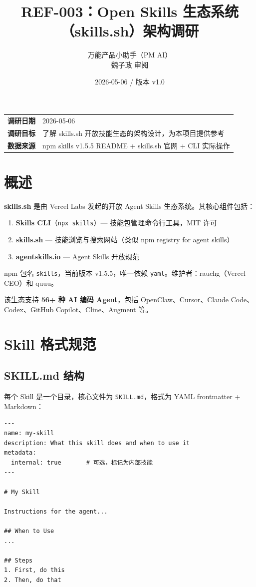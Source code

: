 \documentclass[11pt,a4paper]{article}
\title{\textbf{REF-003：Open Skills 生态系统（skills.sh）架构调研}}
\author{万能产品小助手（PM AI）\\魏子政 审阅}
\date{2026-05-06 / 版本 v1.0}
\begin{document}
\maketitle

\begin{center}
\begin{tabular}{>{\bfseries}p{3cm} p{10cm}}
\toprule
调研日期 & 2026-05-06 \\
调研目标 & 了解 skills.sh 开放技能生态的架构设计，为本项目提供参考 \\
数据来源 & npm skills v1.5.5 README + skills.sh 官网 + CLI 实际操作 \\
\bottomrule
\end{tabular}
\end{center}

\section{概述}

\textbf{skills.sh} 是由 Vercel Labs 发起的开放 Agent Skills 生态系统。其核心组件包括：

\begin{enumerate}[nosep]
  \item \textbf{Skills CLI}（\texttt{npx skills}）--- 技能包管理命令行工具，MIT 许可
  \item \textbf{skills.sh} --- 技能浏览与搜索网站（类似 npm registry for agent skills）
  \item \textbf{agentskills.io} --- Agent Skills 开放规范
\end{enumerate}

npm 包名 \texttt{skills}，当前版本 v1.5.5，唯一依赖 \texttt{yaml}。维护者：rauchg（Vercel CEO）和 quuu。

该生态支持 \textbf{56+ 种 AI 编码 Agent}，包括 OpenClaw、Cursor、Claude Code、Codex、GitHub Copilot、Cline、Augment 等。

\section{Skill 格式规范}

\subsection{SKILL.md 结构}

每个 Skill 是一个目录，核心文件为 \texttt{SKILL.md}，格式为 YAML frontmatter + Markdown：

\begin{verbatim}
---
name: my-skill
description: What this skill does and when to use it
metadata:
  internal: true       # 可选，标记为内部技能
---

# My Skill

Instructions for the agent...

## When to Use
...

## Steps
1. First, do this
2. Then, do that
\end{verbatim}
\end{document}
